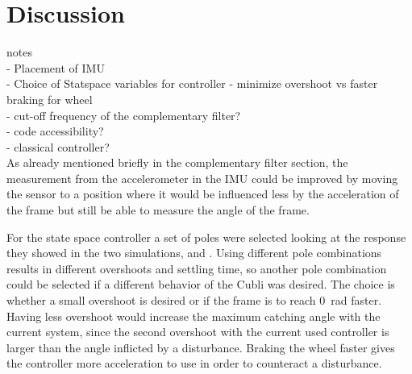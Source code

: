 \chapter{Discussion}

{\Large notes} \\
- Placement of IMU\\
- Choice of Statspace variables for controller - minimize overshoot vs faster braking for wheel\\
- cut-off frequency of the complementary filter?\\
- code accessibility?\\
- classical controller?\\


As already mentioned briefly in the complementary filter section, the measurement from the accelerometer in the IMU could be improved by moving the sensor to a position where it would be influenced less by the acceleration of the frame but still be able to measure the angle of the frame. 

For the state space controller a set of poles were selected looking at the response they showed in the two simulations,  and . Using different pole combinations results in different overshoots and settling time, so another pole combination could be selected if a different behavior of the Cubli was desired. The choice is whether a small overshoot is desired or if the frame is to reach \SI{0}{rad} faster. Having less overshoot would increase the maximum catching angle with the current system, since the second overshoot with the current used controller is larger than the angle inflicted by a disturbance. Braking the wheel faster gives the controller more acceleration to use in order to counteract a disturbance. 



